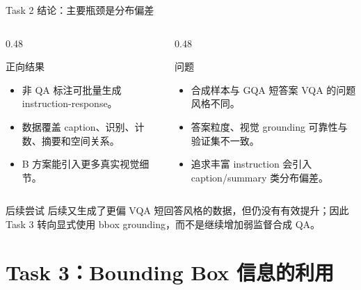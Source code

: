 \documentclass{beamer}
\begin{document}
\begin{frame}{Task 2 结论：主要瓶颈是分布偏差}
\small
\begin{columns}[T,onlytextwidth]
\begin{column}{0.48\textwidth}
\begin{block}{正向结果}
\begin{itemize}
\item 非 QA 标注可批量生成 instruction-response。
\item 数据覆盖 caption、识别、计数、摘要和空间关系。
\item B 方案能引入更多真实视觉细节。
\end{itemize}
\end{block}
\end{column}
\begin{column}{0.48\textwidth}
\begin{block}{问题}
\begin{itemize}
\item 合成样本与 GQA 短答案 VQA 的问题风格不同。
\item 答案粒度、视觉 grounding 可靠性与验证集不一致。
\item 追求丰富 instruction 会引入 caption/summary 类分布偏差。
\end{itemize}
\end{block}
\end{column}
\end{columns}
\vspace{0.4em}
\begin{block}{后续尝试}
后续又生成了更偏 VQA 短回答风格的数据，但仍没有有效提升；因此 Task 3 转向显式使用 bbox grounding，而不是继续增加弱监督合成 QA。
\end{block}
\end{frame}

\section{Task 3：Bounding Box 信息的利用}
\end{document}
